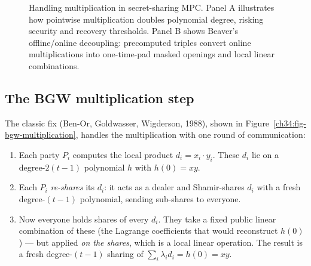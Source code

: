 \begin{figure}[H]
\caption{Handling multiplication in secret-sharing MPC. Panel A illustrates how pointwise multiplication doubles polynomial degree, risking security and recovery thresholds. Panel B shows Beaver's offline/online decoupling: precomputed triples convert online multiplications into one-time-pad masked openings and local linear combinations.}
\label{ch34:fig-degree}
\end{figure}

\subsection{The BGW multiplication step}

The classic fix (Ben-Or, Goldwasser, Wigderson, 1988), shown in Figure~\ref{ch34:fig-bgw-multiplication}, handles the multiplication with one round of communication:

\begin{enumerate}
  \item Each party $P_i$ computes the local product $d_i = x_i \cdot y_i$. These $d_i$ lie on a degree-$2(t-1)$ polynomial $h$ with $h(0) = xy$.
  \item Each $P_i$ \emph{re-shares} its $d_i$: it acts as a dealer and Shamir-shares $d_i$ with a fresh degree-$(t-1)$ polynomial, sending sub-shares to everyone.
  \item Now everyone holds shares of every $d_i$. They take a fixed public linear combination of these (the Lagrange coefficients that would reconstruct $h(0)$) --- but applied \emph{on the shares}, which is a local linear operation. The result is a fresh degree-$(t-1)$ sharing of $\sum_i \lambda_i d_i = h(0) = xy$.
\end{enumerate}

